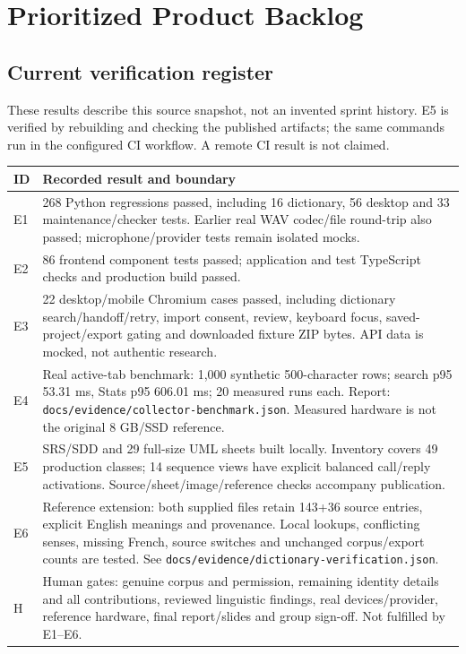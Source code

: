 \documentclass[11pt,a4paper]{article}
\begin{document}
\section{Prioritized Product Backlog}
\subsection{Current verification register}
These results describe this source snapshot, not an invented sprint history.
E5 is verified by rebuilding and checking the published artifacts; the same
commands run in the configured CI workflow. A remote CI result is not claimed.
\begin{longtable}{L{1cm}L{13.3cm}}
\toprule\textbf{ID} & \textbf{Recorded result and boundary}\\\midrule\endhead
E1 & 268 Python regressions passed, including 16 dictionary, 56 desktop and 33 maintenance/checker tests. Earlier real WAV codec/file round-trip also passed; microphone/provider tests remain isolated mocks.\\
E2 & 86 frontend component tests passed; application and test TypeScript checks and production build passed.\\
E3 & 22 desktop/mobile Chromium cases passed, including dictionary search/handoff/retry, import consent, review, keyboard focus, saved-project/export gating and downloaded fixture ZIP bytes. API data is mocked, not authentic research.\\
E4 & Real active-tab benchmark: 1,000 synthetic 500-character rows; search p95 53.31 ms, Stats p95 606.01 ms; 20 measured runs each. Report: \nolinkurl{docs/evidence/collector-benchmark.json}. Measured hardware is not the original 8 GB/SSD reference.\\
E5 & SRS/SDD and 29 full-size UML sheets built locally. Inventory covers 49 production classes; 14 sequence views have explicit balanced call/reply activations. Source/sheet/image/reference checks accompany publication.\\
E6 & Reference extension: both supplied files retain 143+36 source entries, explicit English meanings and provenance. Local lookups, conflicting senses, missing French, source switches and unchanged corpus/export counts are tested. See \nolinkurl{docs/evidence/dictionary-verification.json}.\\
H & Human gates: genuine corpus and permission, remaining identity details and all contributions, reviewed linguistic findings, real devices/provider, reference hardware, final report/slides and group sign-off. Not fulfilled by E1--E6.\\
\bottomrule\end{longtable}
\end{document}
